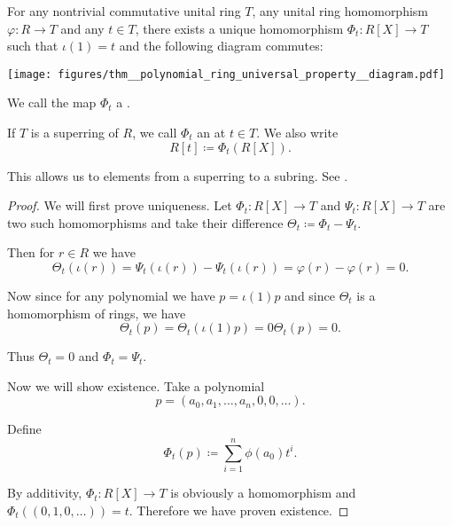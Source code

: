 \begin{proposition}\label{thm:polynomial_ring_universal_property}
  For any nontrivial commutative unital ring \( T \), any unital ring homomorphism \( \varphi: R \to T \) and any \( t \in T \), there exists a unique homomorphism \( \Phi_t: R[X] \to T \) such that \( \iota(1) = t \) and the following diagram commutes:

  \begin{alignedeq}\label{thm:polynomial_ring_universal_property/diagram}
    \texttt{[image: figures/thm\_\_polynomial\_ring\_universal\_property\_\_diagram.pdf]}
  \end{alignedeq}

  We call the map \( \Phi_t \) a .

  If \( T \) is a superring of \( R \), we call \( \Phi_t \) an  at \( t \in T \). We also write
  \begin{equation}
    R[t] \coloneqq \Phi_t(R[X]).
  \end{equation}

  This allows us to  elements from a superring to a subring. See .
\end{proposition}
\begin{proof}
  We will first prove uniqueness. Let \( \Phi_t: R[X] \to T \) and \( \Psi_t: R[X] \to T \) are two such homomorphisms and take their difference \( \Theta_t \coloneqq \Phi_t - \Psi_t \).

  Then for \( r \in R \) we have
  \begin{equation*}
    \Theta_t(\iota(r)) = \Psi_t(\iota(r)) - \Psi_t(\iota(r)) = \varphi(r) - \varphi(r) = 0.
  \end{equation*}

  Now since for any polynomial we have \( p = \iota(1) p \) and since \( \Theta_t \) is a homomorphism of rings, we have
  \begin{equation*}
    \Theta_t(p) = \Theta_t(\iota(1) p) = 0 \Theta_t(p) = 0.
  \end{equation*}

  Thus \( \Theta_t = 0 \) and \( \Phi_t = \Psi_t \).

  Now we will show existence. Take a polynomial
  \begin{equation*}
    p = (a_0, a_1, \ldots, a_n, 0, 0, \ldots).
  \end{equation*}

  Define
  \begin{equation*}
    \Phi_t(p) \coloneqq \sum_{i=1}^n \phi(a_0) t^i.
  \end{equation*}

  By additivity, \( \Phi_t: R[X] \to T \) is obviously a homomorphism and \( \Phi_t((0, 1, 0, \ldots)) = t \). Therefore we have proven existence.
\end{proof}

